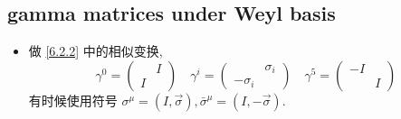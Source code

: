 \subsection{gamma matrices under Weyl basis}
\begin{itemize}
	\item 做 \eqref{6.2.2} 中的相似变换,
	\begin{equation}
		\gamma^0 = \begin{pmatrix}
			& I \\
			I &
		\end{pmatrix} \quad \gamma^i = \begin{pmatrix}
			& \sigma_i \\
			- \sigma_i &
		\end{pmatrix} \quad \gamma^5 = \begin{pmatrix}
			- I & \\
			& I
		\end{pmatrix}
	\end{equation}
	有时候使用符号 $\sigma^\mu = (I, \vec{\sigma}), \bar{\sigma}^\mu = (I, - \vec{\sigma})$.
\end{itemize}

